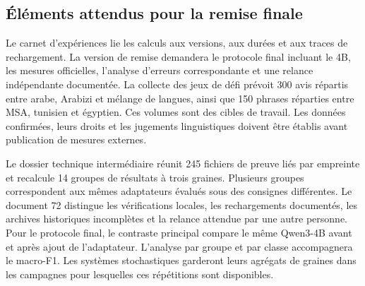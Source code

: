 \subsection{Éléments attendus pour la remise finale}
Le carnet d’expériences lie les calculs aux versions, aux durées et aux traces de rechargement. La version de remise demandera le protocole final incluant le 4B, les mesures officielles, l’analyse d’erreurs correspondante et une relance indépendante documentée. La collecte des jeux de défi prévoit 300 avis répartis entre arabe, Arabizi et mélange de langues, ainsi que 150 phrases réparties entre MSA, tunisien et égyptien. Ces volumes sont des cibles de travail. Les données confirmées, leurs droits et les jugements linguistiques doivent être établis avant publication de mesures externes.

Le dossier technique intermédiaire réunit 245 fichiers de preuve liés par empreinte et recalcule 14 groupes de résultats à trois graines. Plusieurs groupes correspondent aux mêmes adaptateurs évalués sous des consignes différentes. Le document 72 distingue les vérifications locales, les rechargements documentés, les archives historiques incomplètes et la relance attendue par une autre personne. Pour le protocole final, le contraste principal compare le même Qwen3-4B avant et après ajout de l’adaptateur. L’analyse par groupe et par classe accompagnera le macro-F1. Les systèmes stochastiques garderont leurs agrégats de graines dans les campagnes pour lesquelles ces répétitions sont disponibles.
\FloatBarrier
